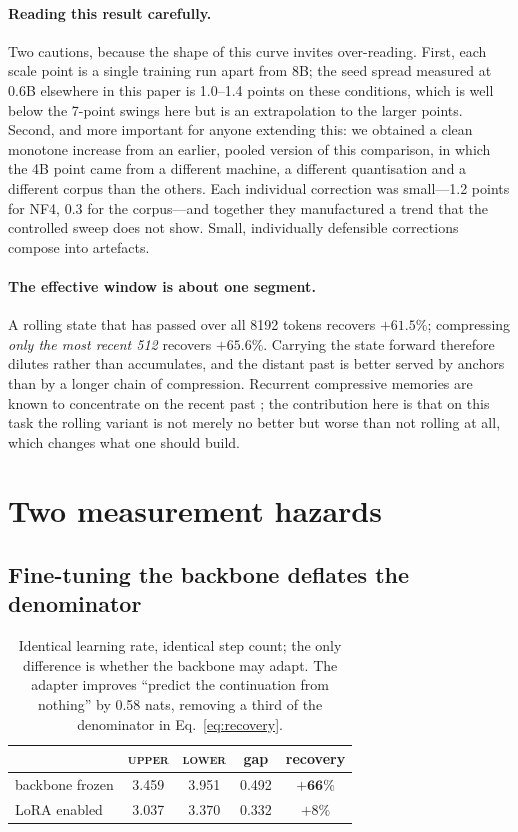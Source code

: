 \documentclass[11pt]{article}
\begin{document}
\paragraph{Reading this result carefully.}
Two cautions, because the shape of this curve invites over-reading. First, each
scale point is a single training run apart from 8B; the seed spread measured at
0.6B elsewhere in this paper is 1.0--1.4 points on these conditions, which is
well below the 7-point swings here but is an extrapolation to the larger points.
Second, and more important for anyone extending this: we obtained a clean
monotone increase from an earlier, pooled version of this comparison, in which
the 4B point came from a different machine, a different quantisation and a
different corpus than the others. Each individual correction was small---1.2
points for NF4, 0.3 for the corpus---and together they manufactured a trend that
the controlled sweep does not show. Small, individually defensible corrections
compose into artefacts.

\paragraph{The effective window is about one segment.}
A rolling state that has passed over all 8192 tokens recovers $+61.5\%$;
compressing \emph{only the most recent 512} recovers $+65.6\%$. Carrying the
state forward therefore dilutes rather than accumulates, and the distant past is
better served by anchors than by a longer chain of compression. Recurrent
compressive memories are known to concentrate on the recent past
\citep{compressive,lcirc}; the contribution here is that on this task the rolling
variant is not merely no better but worse than not rolling at all, which changes
what one should build.

\section{Two measurement hazards}
\label{sec:hazards}

\subsection{Fine-tuning the backbone deflates the denominator}

\begin{table}[ht]
\centering
\begin{tabular}{lcccc}
\toprule
 & \textsc{upper} & \textsc{lower} & gap & recovery \\
\midrule
backbone frozen & 3.459 & 3.951 & 0.492 & $\mathbf{+66\%}$ \\
LoRA enabled    & 3.037 & $\mathbf{3.370}$ & $\mathbf{0.332}$ & $+8\%$ \\
\bottomrule
\end{tabular}
\caption{Identical learning rate, identical step count; the only difference is
whether the backbone may adapt. The adapter improves ``predict the continuation
from nothing'' by 0.58 nats, removing a third of the denominator in
Eq.~\ref{eq:recovery}.}
\label{tab:lora}
\end{table}
\end{document}
